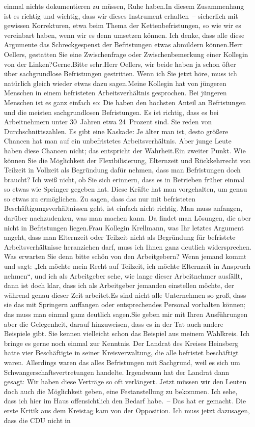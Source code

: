 \documentclass{article}
\begin{document}
einmal nichts dokumentieren zu müssen, Ruhe haben.In diesem Zusammenhang ist es richtig und wichtig, dass wir dieses Instrument erhalten – sicherlich mit gewissen Korrekturen, etwa beim Thema der Kettenbefristungen, so wie wir es vereinbart haben, wenn wir es denn umsetzen können. Ich denke, dass alle diese Argumente das Schreckgespenst der Befristungen etwas abmildern können.Herr Oellers, gestatten Sie eine Zwischenfrage oder Zwischenbemerkung einer Kollegin von der Linken?Gerne.Bitte sehr.Herr Oellers, wir beide haben ja schon öfter über sachgrundlose Befristungen gestritten. Wenn ich Sie jetzt höre, muss ich natürlich gleich wieder etwas dazu sagen.Meine Kollegin hat von jüngeren Menschen in einem befristeten Arbeitsverhältnis gesprochen. Bei jüngeren Menschen ist es ganz einfach so: Die haben den höchsten Anteil an Befristungen und die meisten sachgrundlosen Befristungen. Es ist richtig, dass es bei Arbeitnehmern unter 30 Jahren etwa 24 Prozent sind. Sie reden von Durchschnittszahlen. Es gibt eine Kaskade: Je älter man ist, desto größere Chancen hat man auf ein unbefristetes Arbeitsverhältnis. Aber junge Leute haben diese Chancen nicht; das entspricht der Wahrheit.Ein zweiter Punkt. Wie können Sie die Möglichkeit der Flexibilisierung, Elternzeit und Rückkehrrecht von Teilzeit in Vollzeit als Begründung dafür nehmen, dass man Befristungen doch braucht? Ich weiß nicht, ob Sie sich erinnern, dass es in Betrieben früher einmal so etwas wie Springer gegeben hat. Diese Kräfte hat man vorgehalten, um genau so etwas zu ermöglichen. Zu sagen, dass das nur mit befristeten Beschäftigungsverhältnissen geht, ist einfach nicht richtig. Man muss anfangen, darüber nachzudenken, was man machen kann. Da findet man Lösungen, die aber nicht in Befristungen liegen.Frau Kollegin Krellmann, was Ihr letztes Argument angeht, dass man Elternzeit oder Teilzeit nicht als Begründung für befristete Arbeitsverhältnisse heranziehen darf, muss ich Ihnen ganz deutlich widersprechen. Was erwarten Sie denn bitte schön von den Arbeitgebern? Wenn jemand kommt und sagt: „Ich möchte mein Recht auf Teilzeit, ich möchte Elternzeit in Anspruch nehmen“, und ich als Arbeitgeber sehe, wie lange dieser Arbeitnehmer ausfällt, dann ist doch klar, dass ich als Arbeitgeber jemanden einstellen möchte, der während genau dieser Zeit arbeitet.Es sind nicht alle Unternehmen so groß, dass sie das mit Springern auffangen oder entsprechendes Personal vorhalten können; das muss man einmal ganz deutlich sagen.Sie geben mir mit Ihren Ausführungen aber die Gelegenheit, darauf hinzuweisen, dass es in der Tat auch andere Beispiele gibt. Sie kennen vielleicht schon das Beispiel aus meinem Wahlkreis. Ich bringe es gerne noch einmal zur Kenntnis. Der Landrat des Kreises Heinsberg hatte vier Beschäftigte in seiner Kreisverwaltung, die alle befristet beschäftigt waren. Allerdings waren das alles Befristungen mit Sachgrund, weil es sich um Schwangerschaftsvertretungen handelte. Irgendwann hat der Landrat dann gesagt: Wir haben diese Verträge so oft verlängert. Jetzt müssen wir den Leuten doch auch die Möglichkeit geben, eine Festanstellung zu bekommen. Ich sehe, dass ich hier im Haus offensichtlich den Bedarf habe. – Das hat er gemacht. Die erste Kritik aus dem Kreistag kam von der Opposition. Ich muss jetzt dazusagen, dass die CDU nicht in 
\end{document}
